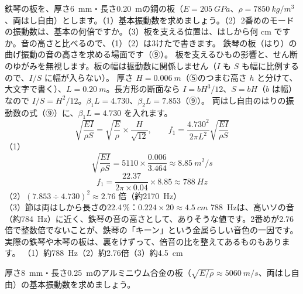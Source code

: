 \label{ph:波-6:ex12}
\begin{phreidai}[鉄琴の板の音]
鉄琴の板を、厚さ\qty{6}{mm}・長さ\qty{0.20}{m}の鋼の板（$E=\qty{205}{GPa}$、$\rho=\qty{7850}{kg/m^3}$、両はし自由）とします。（1）基本振動数を求めましょう。（2）2番めのモードの振動数は、基本の何倍ですか。（3）板を支える位置は、はしから何 cm ですか。音の高さと比べるので、（1）（2）は3けたで書きます。
\phbamen
鉄琴の板（はり）の曲げ振動の音の高さを求める場面です（⑨）。
\phmushi
板を支えるひもの影響と、せん断のゆがみを無視します。板の幅は振動数に関係しません（$I$ も $S$ も幅に比例するので、$I/S$ に幅が入らない）。
\phzu
厚さ $H=\qty{0.006}{m}$（⑤のつまむ高さ $h$ と分けて、大文字で書く）、$L=\qty{0.20}{m}$。長方形の断面なら $I=bH^3/12$、$S=bH$（$b$ は幅）なので $I/S=H^2/12$。$\beta_1L=4.730$、$\beta_2L=7.853$（⑨）。
\phriyu
両はし自由のはりの振動数の式（⑨）に、$\beta_1L=4.730$ を入れます。
\phtateru
\[\sqrt{\frac{EI}{\rho S}}=\sqrt{\frac{E}{\rho}}\times\frac{H}{\sqrt{12}},\qquad f_1=\frac{4.730^2}{2\pi L^2}\sqrt{\frac{EI}{\rho S}}\]
\phtoku
（1）\[\sqrt{\frac{EI}{\rho S}}=5110\times\frac{0.006}{3.464}\approx\qty{8.85}{m^2/s}\]
\[f_1=\frac{22.37}{2\pi\times0.04}\times8.85\approx\qty{788}{Hz}\]
（2）$(7.853\div4.730)^2\approx2.76$ 倍（約\qty{2170}{Hz}）\\
（3）節は両はしから長さの22.4\,\%：$0.224\times20\approx\qty{4.5}{cm}$
\phtashikame
\qty{788}{Hz}は、高いソの音（約\qty{784}{Hz}）に近く、鉄琴の音の高さとして、ありそうな値です。2番めが2.76倍で整数倍でないことが、鉄琴の「キーン」という金属らしい音色の一因です。実際の鉄琴や木琴の板は、裏をけずって、倍音の比を整えてあるものもあります。
\kotae （1）約\qty{788}{Hz}（2）約2.76倍（3）約\qty{4.5}{cm}
\end{phreidai}
\begin{jibun}
厚さ\qty{8}{mm}・長さ\qty{0.25}{m}のアルミニウム合金の板（$\sqrt{E/\rho}\approx\qty{5060}{m/s}$、両はし自由）の基本振動数を求めましょう。
\end{jibun}

